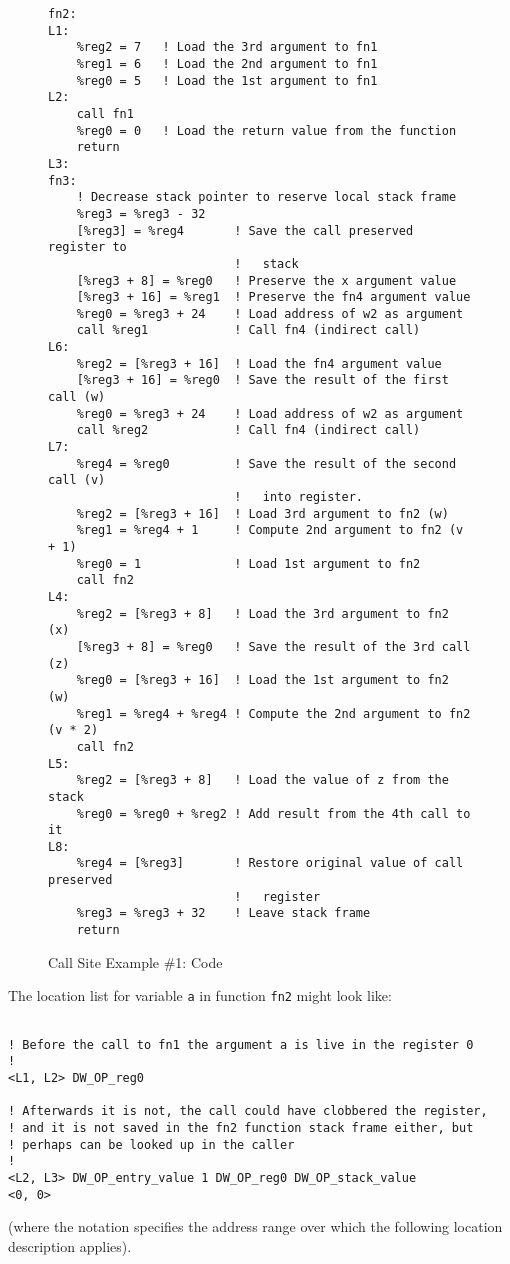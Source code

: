 \begin{figure}[ht]
\begin{lstlisting}
fn2:
L1:
    %reg2 = 7   ! Load the 3rd argument to fn1
    %reg1 = 6   ! Load the 2nd argument to fn1
    %reg0 = 5   ! Load the 1st argument to fn1
L2:
    call fn1
    %reg0 = 0   ! Load the return value from the function
    return
L3:
fn3:
    ! Decrease stack pointer to reserve local stack frame
    %reg3 = %reg3 - 32
    [%reg3] = %reg4       ! Save the call preserved register to
                          !   stack
    [%reg3 + 8] = %reg0   ! Preserve the x argument value
    [%reg3 + 16] = %reg1  ! Preserve the fn4 argument value
    %reg0 = %reg3 + 24    ! Load address of w2 as argument
    call %reg1            ! Call fn4 (indirect call)
L6:
    %reg2 = [%reg3 + 16]  ! Load the fn4 argument value
    [%reg3 + 16] = %reg0  ! Save the result of the first call (w)
    %reg0 = %reg3 + 24    ! Load address of w2 as argument
    call %reg2            ! Call fn4 (indirect call)
L7:
    %reg4 = %reg0         ! Save the result of the second call (v) 
                          !   into register.
    %reg2 = [%reg3 + 16]  ! Load 3rd argument to fn2 (w)
    %reg1 = %reg4 + 1     ! Compute 2nd argument to fn2 (v + 1)
    %reg0 = 1             ! Load 1st argument to fn2
    call fn2
L4:
    %reg2 = [%reg3 + 8]   ! Load the 3rd argument to fn2 (x)
    [%reg3 + 8] = %reg0   ! Save the result of the 3rd call (z)
    %reg0 = [%reg3 + 16]  ! Load the 1st argument to fn2 (w)
    %reg1 = %reg4 + %reg4 ! Compute the 2nd argument to fn2 (v * 2)
    call fn2
L5:
    %reg2 = [%reg3 + 8]   ! Load the value of z from the stack
    %reg0 = %reg0 + %reg2 ! Add result from the 4th call to it
L8:
    %reg4 = [%reg3]       ! Restore original value of call preserved 
                          !   register
    %reg3 = %reg3 + 32    ! Leave stack frame
    return
\end{lstlisting}
\caption{Call Site Example \#1: Code}
\label{fig:callsiteexample1code}
\end{figure}

\clearpage
The location list for variable \texttt{a} in function \texttt{fn2}
might look like:
\begin{lstlisting}

! Before the call to fn1 the argument a is live in the register 0
!
<L1, L2> DW_OP_reg0

! Afterwards it is not, the call could have clobbered the register,
! and it is not saved in the fn2 function stack frame either, but 
! perhaps can be looked up in the caller
!
<L2, L3> DW_OP_entry_value 1 DW_OP_reg0 DW_OP_stack_value
<0, 0>

\end{lstlisting}
(where the notation  specifies the address
range over which the following location description applies).

